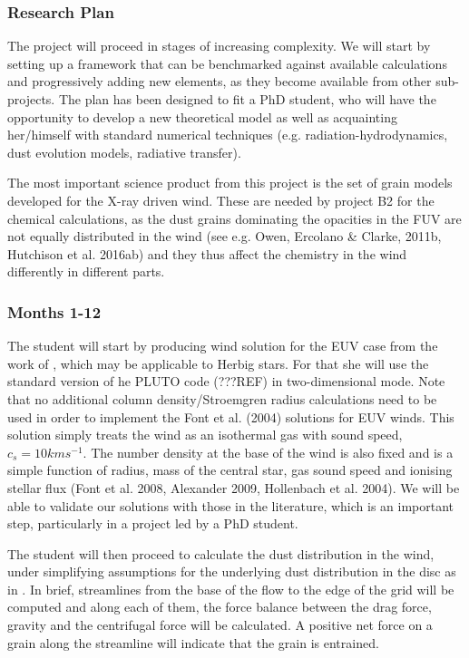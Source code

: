 \documentclass[10pt,fleqn,twoside]{article}
\begin{document}
\subsubsection{Research Plan} 

The project will proceed in stages of increasing complexity. We will start
by setting up a framework that can be benchmarked against available
calculations and progressively adding new elements, as they become
available from other sub-projects. The plan has been designed to fit a
PhD student, who will have the opportunity to develop a new theoretical
model as well as acquainting her/himself with standard numerical
techniques (e.g. radiation-hydrodynamics, dust evolution models,
radiative transfer). 

The most important science product from this project is the set of
grain models developed for the  X-ray driven wind. These are needed by
project B2 for the chemical calculations, as the dust
grains dominating the opacities in the FUV are not equally distributed
in the wind (see e.g. Owen, Ercolano \& Clarke, 2011b, Hutchison et
al. 2016ab) and they thus affect the chemistry in the wind
differently in different parts. 

\subsubsection{Months 1-12}
The student will start by producing wind solution for the EUV case
from the work of \citet{2004ApJ...607..890F}, which may be applicable
to Herbig stars. For that she will use the standard version of he PLUTO code (???REF) in
two-dimensional mode. Note that no additional column density/Stroemgren radius
calculations need to be used in order to implement the Font et
al. (2004) solutions for EUV winds. This solution simply treats the
wind as an isothermal gas with sound speed, $c_s = 10km s^{-1}$. The
number density at the base of the wind is also fixed and is a simple
function of radius, mass of the central star, gas sound speed and
ionising stellar flux (Font et al. 2008, Alexander 2009, Hollenbach et
al. 2004). We will be able to validate our solutions with those in the
literature, which is an important step, particularly in a project led
by a PhD student. 

The student will then proceed to calculate the dust
distribution in the wind, under simplifying assumptions for the
underlying dust distribution in the disc as in \citet{2011MNRAS.411.1104O}. In
brief, streamlines from the base of the flow to the edge of the grid
will be computed and along each of them, the force balance between the
drag force, gravity and the centrifugal force will be calculated. A
positive net force on a grain along the streamline will indicate that
the grain is entrained.
\end{document}
